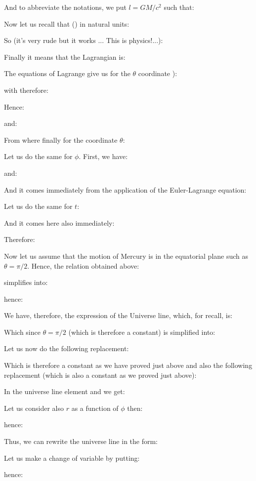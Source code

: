 	And to abbreviate the notations, we put $l=GM/c^2$ such that:
	
	Now let us recall that () in natural units:
	
	So (it's very rude but it works ... This is physics!...):
	
	Finally it means that the Lagrangian is:
	
	The equations of Lagrange give us for the $\theta$ coordinate ):
	
	with therefore:
	
	Hence:
	
	and:
	
	From where finally for the coordinate $\theta$:
	
	Let us do the same for $\phi$. First, we have:
	
	and:
	
	And it comes immediately from the application of the Euler-Lagrange equation:
	
	Let us do the same for $t$:
	
	And it comes here also immediately:
	
	Therefore:
	
	Now let us assume that the motion of Mercury is in the equatorial plane such as $\theta=\pi/2$. Hence, the relation obtained above:
	
	simplifies into:
	
	hence:
	
	We have, therefore, the expression of the Universe line, which, for recall, is:
	
	Which since $\theta=\pi/2$ (which is therefore a constant) is simplified into:
	
	Let us now do the following replacement:
	
	Which is therefore a constant as we have proved just above and also the following replacement (which is also a constant as we proved just above):
	
	In the universe line element and we get:
	
	Let us consider also $r$ as a function of $\phi$ then:
	
	hence:
	
	Thus, we can rewrite the universe line in the form:
	
	Let us make a change of variable by putting:
	
	hence:
	
